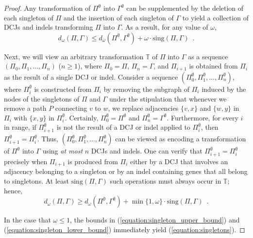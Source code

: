 \begin{proof}
Any transformation of $\Pi^{\emptyset}$ into $\Gamma^{\emptyset}$ can be supplemented by the deletion of each singleton of $\Pi$ and the insertion of each singleton of $\Gamma$ to yield a collection of DCJs and indels transforming $\Pi$ into $\Gamma$.  As a result, for any value of $\omega$,
\begin{equation}
d_{\omega}(\Pi, \Gamma) \leq d_{\omega}(\Pi^{\emptyset}, \Gamma^{\emptyset}) + \omega \cdot \mathrm{sing}(\Pi, \Gamma)\enspace.
\label{equation:singleton_upper_bound}
\end{equation}

Next, we will view an arbitrary transformation $\mathbb{T}$ of $\Pi$ into $\Gamma$ as a sequence $(\Pi_0, \Pi_1, \ldots, \Pi_n)$ ($n \geq 1$), where $\Pi_0 = \Pi$, $\Pi_n = \Gamma$, and $\Pi_{i+1}$ is obtained from $\Pi_i$ as the result of a single DCJ or indel. Consider a sequence $(\Pi^{\emptyset}_0, \Pi^{\emptyset}_1, \ldots, \Pi^{\emptyset}_n)$, where $\Pi^{\emptyset}_i$ is constructed from $\Pi_i$ by removing the subgraph of $\Pi_i$ induced by the nodes of the singletons of $\Pi$ and $\Gamma$ under the stipulation that whenever we remove a path $P$ connecting $v$ to $w$, we replace adjacencies $\{v, x\}$ and $\{w, y\}$ in $\Pi_i$ with $\{x, y\}$ in $\Pi^{\emptyset}_i$.  Certainly, $\Pi^{\emptyset}_0 = \Pi^{\emptyset}$ and $\Pi^{\emptyset}_n = \Gamma^{\emptyset}$. Furthermore, for every $i$ in range, if $\Pi^{\emptyset}_{i+1}$ is not the result of a DCJ or indel applied to $\Pi^{\emptyset}_i$, then $\Pi^{\emptyset}_{i+1} = \Pi^{\emptyset}_i$. Thus, $(\Pi^{\emptyset}_0, \Pi^{\emptyset}_1, \ldots, \Pi^{\emptyset}_n)$ can be viewed as encoding a transformation of $\Pi^{\emptyset}$ into $\Gamma$ using \emph{at most} $n$ DCJs and indels.  One can verify that $\Pi^{\emptyset}_{i+1} = \Pi^{\emptyset}_i$ precisely when $\Pi_{i+1}$ is produced from $\Pi_i$ either by a DCJ that involves an adjacency belonging to a singleton or by an indel containing genes that all belong to singletons.  At least $\mathrm{sing}(\Pi, \Gamma)$ such operations must always occur in $\mathbb{T}$; hence,
\begin{equation}
d_{\omega}(\Pi, \Gamma) \geq d_{\omega}(\Pi^{\emptyset}, \Gamma^{\emptyset}) + \min{\{1, \omega\}} \cdot \mathrm{sing}(\Pi, \Gamma)\enspace.
\label{equation:singleton_lower_bound}
\end{equation}

\noindent In the case that $\omega \leq 1$, the bounds in (\ref{equation:singleton_upper_bound}) and (\ref{equation:singleton_lower_bound}) immediately yield (\ref{equation:singletons}).


\end{proof}
